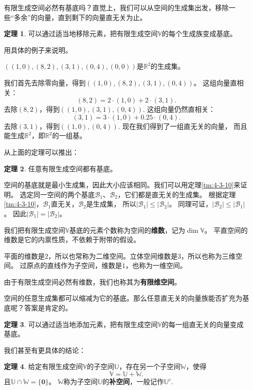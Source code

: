 \documentclass[12pt,UTF8]{ctexbook}
\theoremstyle{definition}
\newtheorem{tm}{定理}[section]
\theoremstyle{plain}
\begin{document}
有限生成空间必然有基底吗？直觉上，我们可以从空间的生成集出发，移除一些“多余”的向量，直到剩下的向量直无关为止。

\begin{tm}\label{tm:4-3-40}
    可以通过适当地移除元素，把有限生成空间$\mathbb{V}$的每个生成族变成基底。
\end{tm}

用具体的例子来说明。

$\left((1,0),(8,2),(3,1),(0,4),(0,0)\right)$是$\mathbb{R}^2$的生成集。

我们首先去除零向量，得到$\left((1,0),(8,2),(3,1),(0,4)\right)$。 
这组向量直相关：
$$ (8,2) = 2\cdot(1,0) + 2\cdot(3,1).$$
去除$(8,2)$，得到$\left((1,0),(3,1),(0,4)\right).$ 这组向量仍然直相关：
$$ (3,1) = 3\cdot(1,0) + 0.25\cdot(0,4).$$
去除$(3,1)$，得到$\left((1,0),(0,4)\right).$ 现在我们得到了一组直无关的向量，
而且能生成$\mathbb{R}^2$，即$\mathbb{R}^2$的一组基。

从上面的定理可以推出：
\begin{tm}\label{tm:4-3-50}
    任意有限生成空间都有基底。
\end{tm}

空间的基底就是最小生成集，因此大小应该相同。我们可以用定理\ref{tm:4-3-10}来证明。
选定同一空间的两个基底$\mathcal{B}_1$、$\mathcal{B}_2$，它们都是直无关的生成集。
根据定理\ref{tm:4-3-10}，$\mathcal{B}_1$直无关，$\mathcal{B}_2$是生成集，
所以$|\mathcal{B}_1| \leqslant |\mathcal{B}_2|$。
同理可证，$|\mathcal{B}_2| \leqslant |\mathcal{B}_1|$。
因此$|\mathcal{B}_1| = |\mathcal{B}_2|$。

我们把有限生成空间$\mathbb{V}$基底的元素个数称为空间的\textbf{维数}，记为$\dim \mathbb{V}$。
平直空间的维数是它的内禀性质，不依赖于附带的假设。

平面的维数是$2$，所以也常称为二维空间。立体空间维数是$3$，所以也称为三维空间。
过原点的直线作为子空间，维数是$1$，也称为一维空间。

由于有限生成空间必然有维数，我们也称其为\textbf{有限维空间}。

空间的任意生成集都可以缩减为它的基底。那么任意直无关的向量族能否扩充为基底呢？答案是肯定的。
\begin{tm}\label{tm:4-3-60}
    可以通过适当地添加元素，把有限生成空间$\mathbb{V}$的每一组直无关的向量变成基底。
\end{tm}

我们甚至有更具体的结论：
\begin{tm}\label{tm:4-3-70}
    给定有限生成空间$\mathbb{V}$的子空间$\mathbb{U}$，存在另一个子空间$\mathbb{W}$，使得
    $$ \mathbb{V} = \mathbb{U} + \mathbb{W}.$$
    且$\mathbb{U} \cap \mathbb{W} = \{\mathbf{0}\}$。
    $\mathbb{W}$称为子空间$\mathbb{U}$的\textbf{补空间}，一般记作$\mathbb{U}^c.$
\end{tm}
\end{document}

